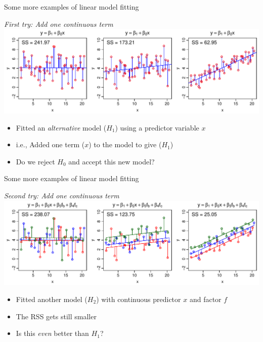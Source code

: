 \documentclass[xcolor=x11names,handout,compress]{beamer}
\renewcommand{\(}{\begin{columns}}
\renewcommand{\)}{\end{columns}}
\newcommand{\<}[1]{\begin{column}{#1}}
\renewcommand{\>}{\end{column}}
\begin{document}
\begin{frame}{Some more examples of linear model fitting}

    \begin{center}
        {\it First try: Add one continuous term}\\

        \includegraphics[width=\textwidth]{ANOVA_mod.pdf}
    \end{center}

\begin{itemize}[<+->]\itemsep10pt
\item Fitted an {\it alternative} model ($H_1$) using a predictor variable $x$
\item i.e., Added one term ($x$) to the model to give ($H_1$)
\item Do we reject $H_0$ and accept this new model?
\end{itemize}

\end{frame}


\begin{frame}{Some more examples of linear model fitting}

    \begin{center}
        {\it Second try: Add one continuous term}\\

        \includegraphics[width=\textwidth]{ANOVA_mod2.pdf}
    \end{center}

\begin{itemize}[<+->]\itemsep6pt
    \item Fitted another model ($H_2$) with continuous predictor $x$ and factor $f$
    \item The RSS gets still smaller 
    \item Is this {\it even} better than $H_1$?
\end{itemize}


\end{frame}
\end{document}
